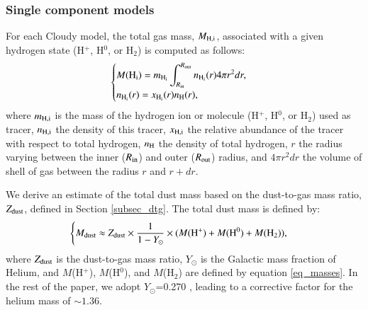 \documentclass{aa}
\begin{document}
\subsubsection{Single component models}
\label{subsect_single_comp}
For each Cloudy model, the total gas mass, $M_{\rm H,i}$, associated with a given hydrogen state (H$^+$, H$^0$, or H$_2$) is computed as follows:
\begin{equation}
    \label{eq_masses}
    \begin{cases}
    \displaystyle M({\rm H_i}) = m_{\rm H_i} \int_{R_{\rm in}}^{R_{\rm out}} n_{\rm H_i}(r) 4\pi r^2 dr, \\
    \displaystyle n_{\rm H_i}(r) = x_{\rm H_i}(r) n_{\rm H}(r),
    \end{cases}    
\end{equation}
where $m_{\rm H,i}$ is the mass of the hydrogen ion or molecule (H$^+$, H$^0$, or H$_2$) used as tracer, $n_{\rm H,i}$ the density of this tracer, $x_{\rm H,i}$ the relative abundance of the tracer with respect to total hydrogen, $n_{\rm H}$ the density of total hydrogen, $r$ the radius varying between the inner ($R_{\rm in}$) and outer ($R_{\rm out}$) radius, and $4\pi r^2 dr$ the volume of shell of gas between the radius $r$ and $r+dr$.

We derive an estimate of the total dust mass based on the dust-to-gas mass ratio, $Z_{\rm dust}$, defined in Section \ref{subsec_dtg}. The total dust mass is defined by:
\begin{equation}
    \begin{cases}
    \displaystyle M_{\rm dust} \approx Z_{\rm dust} \times \frac{1}{1-Y_{\odot}} \times (M({\rm H^+}) + M({\rm H^0}) + M({\rm H_2})), \\
    \end{cases}    
\end{equation}
where $Z_{\rm dust}$ is the dust-to-gas mass ratio, $Y_{\odot}$ is the Galactic mass fraction of Helium, and $M$(H$^+$),  $M$(H$^0$), and $M$(H$_2$) are defined by equation \ref{eq_masses}. In the rest of the paper, we adopt $Y_{\odot}$=0.270 \citep{Asplund_2009}, leading to a corrective factor for the helium mass of $\sim 1.36$.
\end{document}
